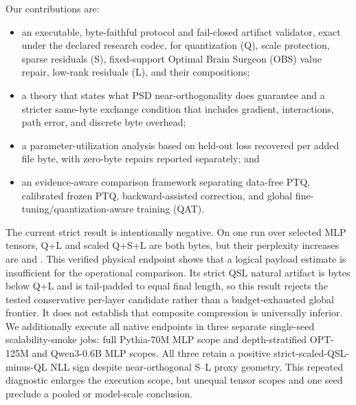Our contributions are:
\begin{itemize}
  \item an executable, byte-faithful protocol and fail-closed artifact
  validator, exact under the declared research codec, for
  quantization (Q), scale protection, sparse residuals (S), fixed-support
  Optimal Brain Surgeon (OBS)
  value repair, low-rank residuals (L), and their compositions;
  \item a theory that states what PSD near-orthogonality does guarantee and a
  stricter same-byte exchange condition that includes gradient, interactions,
  path error, and discrete byte overhead;
  \item a parameter-utilization analysis based on held-out loss recovered per
  added file byte, with zero-byte repairs reported separately; and
  \item an evidence-aware comparison framework separating data-free PTQ,
  calibrated frozen PTQ, backward-assisted correction, and global
  fine-tuning/quantization-aware training (QAT).
\end{itemize}

The current strict result is intentionally negative.  On one \VerifiedModel{}
run over \VerifiedTensorCount{} selected MLP tensors, Q+L and scaled Q+S+L are
both \QLBytes{} bytes, but their perplexity increases are \QLDeltaPPL{} and
\StrictQSLDeltaPPL{}.  This verified physical endpoint shows that a logical
payload estimate is insufficient for the operational comparison.  Its strict
QSL natural artifact is \StrictQSLTailPaddingBytes{} bytes below Q+L and is
tail-padded to equal final length, so this result rejects the tested
conservative per-layer candidate rather than a budget-exhausted global
frontier.  It does not establish that composite compression is universally
inferior.  We additionally
execute all native endpoints in three separate single-seed scalability-smoke
jobs: full Pythia-70M MLP scope and depth-stratified OPT-125M and Qwen3-0.6B
MLP scopes.  All three retain a positive strict-scaled-QSL-minus-QL NLL sign
despite near-orthogonal S--L proxy geometry.  This repeated diagnostic enlarges
the execution scope, but unequal tensor scopes and one seed preclude a pooled
or model-scale conclusion.
